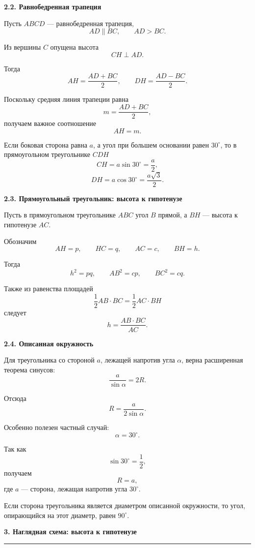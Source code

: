 \documentclass[a4paper,12pt]{article}
\newcommand{\Section}[1]{%
    \vspace{0.4em}%
    {\Large\bfseries\color{darkaccent}#1}\par
    \vspace{0.25em}
    \noindent
    \textcolor{linegray}{\rule{\linewidth}{0.6pt}}
    \vspace{0.5em}%
}
\newcommand{\Subsection}[1]{%
    \vspace{0.3em}%
    {\large\bfseries\color{accent}#1}\par
    \vspace{0.25em}%
}
\begin{document}
\Subsection{2.2. Равнобедренная трапеция}

Пусть $ABCD$ --- равнобедренная трапеция,
\[
AD\parallel BC,
\qquad
AD>BC.
\]

Из вершины $C$ опущена высота
\[
CH\perp AD.
\]

Тогда
\[
AH=\frac{AD+BC}{2},
\qquad
DH=\frac{AD-BC}{2}.
\]

Поскольку средняя линия трапеции равна
\[
m=\frac{AD+BC}{2},
\]
получаем важное соотношение
\[
\boxed{AH=m}.
\]

Если боковая сторона равна $a$,
а угол при большем основании равен $30^\circ$,
то в прямоугольном треугольнике $CDH$
\[
CH=a\sin30^\circ=\frac a2,
\]
\[
DH=a\cos30^\circ=\frac{a\sqrt3}{2}.
\]

\Subsection{2.3. Прямоугольный треугольник: высота к гипотенузе}

Пусть в прямоугольном треугольнике $ABC$
угол $B$ прямой,
а $BH$ --- высота к гипотенузе $AC$.

Обозначим
\[
AH=p,
\qquad
HC=q,
\qquad
AC=c,
\qquad
BH=h.
\]

Тогда
\[
\boxed{h^2=pq},
\qquad
\boxed{AB^2=cp},
\qquad
\boxed{BC^2=cq}.
\]

Также из равенства площадей
\[
\frac12 AB\cdot BC
=
\frac12 AC\cdot BH
\]
следует
\[
\boxed{
h=\frac{AB\cdot BC}{AC}
}.
\]

\Subsection{2.4. Описанная окружность}

Для треугольника со стороной $a$,
лежащей напротив угла $\alpha$,
верна расширенная теорема синусов:
\[
\frac{a}{\sin\alpha}=2R.
\]

Отсюда
\[
\boxed{
R=\frac{a}{2\sin\alpha}
}.
\]

Особенно полезен частный случай:
\[
\alpha=30^\circ.
\]

Так как
\[
\sin30^\circ=\frac12,
\]
получаем
\[
\boxed{R=a},
\]
где $a$ --- сторона,
лежащая напротив угла $30^\circ$.

Если сторона треугольника является диаметром
описанной окружности,
то угол, опирающийся на этот диаметр,
равен $90^\circ$.

\clearpage

\Section{3. Наглядная схема: высота к гипотенузе}
\end{document}
